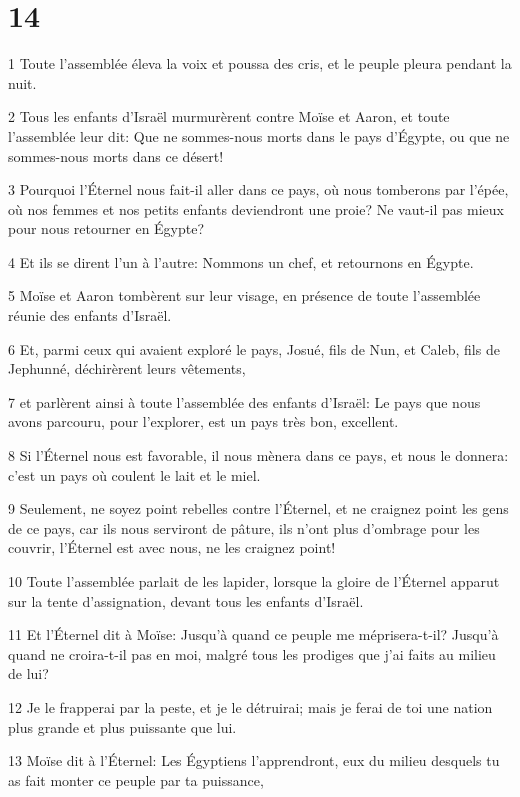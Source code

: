 \chapter{14}

\par 1 Toute l'assemblée éleva la voix et poussa des cris, et le peuple pleura pendant la nuit.
\par 2 Tous les enfants d'Israël murmurèrent contre Moïse et Aaron, et toute l'assemblée leur dit: Que ne sommes-nous morts dans le pays d'Égypte, ou que ne sommes-nous morts dans ce désert!
\par 3 Pourquoi l'Éternel nous fait-il aller dans ce pays, où nous tomberons par l'épée, où nos femmes et nos petits enfants deviendront une proie? Ne vaut-il pas mieux pour nous retourner en Égypte?
\par 4 Et ils se dirent l'un à l'autre: Nommons un chef, et retournons en Égypte.
\par 5 Moïse et Aaron tombèrent sur leur visage, en présence de toute l'assemblée réunie des enfants d'Israël.
\par 6 Et, parmi ceux qui avaient exploré le pays, Josué, fils de Nun, et Caleb, fils de Jephunné, déchirèrent leurs vêtements,
\par 7 et parlèrent ainsi à toute l'assemblée des enfants d'Israël: Le pays que nous avons parcouru, pour l'explorer, est un pays très bon, excellent.
\par 8 Si l'Éternel nous est favorable, il nous mènera dans ce pays, et nous le donnera: c'est un pays où coulent le lait et le miel.
\par 9 Seulement, ne soyez point rebelles contre l'Éternel, et ne craignez point les gens de ce pays, car ils nous serviront de pâture, ils n'ont plus d'ombrage pour les couvrir, l'Éternel est avec nous, ne les craignez point!
\par 10 Toute l'assemblée parlait de les lapider, lorsque la gloire de l'Éternel apparut sur la tente d'assignation, devant tous les enfants d'Israël.
\par 11 Et l'Éternel dit à Moïse: Jusqu'à quand ce peuple me méprisera-t-il? Jusqu'à quand ne croira-t-il pas en moi, malgré tous les prodiges que j'ai faits au milieu de lui?
\par 12 Je le frapperai par la peste, et je le détruirai; mais je ferai de toi une nation plus grande et plus puissante que lui.
\par 13 Moïse dit à l'Éternel: Les Égyptiens l'apprendront, eux du milieu desquels tu as fait monter ce peuple par ta puissance,
